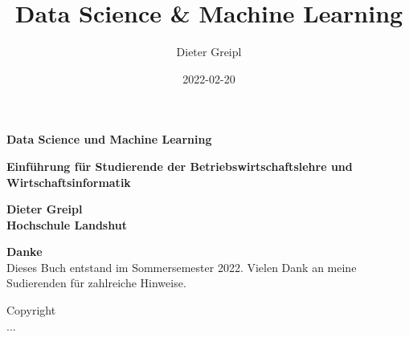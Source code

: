 \documentclass[
  oneside]{book}
\title{Data Science \& Machine Learning}
\author{Dieter Greipl}
\date{2022-02-20}
\begin{document}
\maketitle


\begin{titlepage}

\begin{center}

\Huge \textbf{Data Science und Machine Learning}

\Large \textbf{Einführung für Studierende der Betriebswirtschaftslehre und Wirtschaftsinformatik}


\end{center}

\noindent{}

\vspace{-3cm}
\hfill
\begin{minipage}[b][1cm][t]{10cm}
  \color{white}
  \begin{flushright}
     \Huge\textbf{Dieter Greipl}\\
     \Large\textbf{Hochschule Landshut}\\
  \end{flushright}
\end{minipage}

\end{titlepage}

\begin{titlepage}
\hfill
\begin{minipage}[r][10cm][t]{10cm}
\large \textbf{Danke}\\
	Dieses Buch entstand im Sommersemester 2022. Vielen Dank an meine Sudierenden für zahlreiche Hinweise.
\end{minipage}

\vfill
\begin{minipage}[b][10cm][b]{10cm}
\large{Copyright}\\
	...
\end{minipage}

\end{titlepage}
\end{document}
